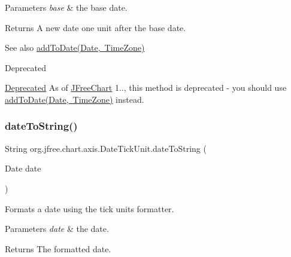 \begin{DoxyParams}{Parameters}
{\em base} & the base date.\\
\hline
\end{DoxyParams}
\begin{DoxyReturn}{Returns}
A new date one unit after the base date.
\end{DoxyReturn}
\begin{DoxySeeAlso}{See also}
\mbox{\hyperlink{classorg_1_1jfree_1_1chart_1_1axis_1_1_date_tick_unit_ab38d03b8c2c07df7637733044043524d}{add\+To\+Date(\+Date, Time\+Zone)}}
\end{DoxySeeAlso}
\begin{DoxyRefDesc}{Deprecated}
\item[\mbox{\hyperlink{deprecated__deprecated000022}{Deprecated}}]As of \mbox{\hyperlink{classorg_1_1jfree_1_1chart_1_1_j_free_chart}{J\+Free\+Chart}} 1.., this method is deprecated -\/ you should use \mbox{\hyperlink{classorg_1_1jfree_1_1chart_1_1axis_1_1_date_tick_unit_ab38d03b8c2c07df7637733044043524d}{add\+To\+Date(\+Date, Time\+Zone)}} instead. \end{DoxyRefDesc}
\mbox{\label{classorg_1_1jfree_1_1chart_1_1axis_1_1_date_tick_unit_ae26d7a9d613ab18d6dad3860e6da5885}} 
\subsubsection{\texorpdfstring{date\+To\+String()}{dateToString()}}
{\footnotesize\ttfamily String org.\+jfree.\+chart.\+axis.\+Date\+Tick\+Unit.\+date\+To\+String (\begin{DoxyParamCaption}\item[{Date}]{date }\end{DoxyParamCaption})}

Formats a date using the tick unit\textquotesingle{}s formatter.


\begin{DoxyParams}{Parameters}
{\em date} & the date.\\
\hline
\end{DoxyParams}
\begin{DoxyReturn}{Returns}
The formatted date. 
\end{DoxyReturn}
\mbox{\label{classorg_1_1jfree_1_1chart_1_1axis_1_1_date_tick_unit_a12b7de1fd09c48dc9a46989e013e0106}} 
